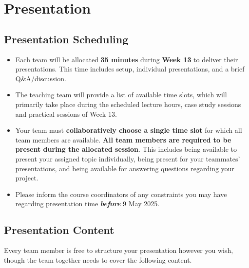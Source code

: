 \documentclass{csse4400}
\begin{document}
\section{Presentation}

\subsection{Presentation Scheduling}

\begin{itemize}
  \item Each team will be allocated \textbf{35 minutes} during \textbf{Week 13} to deliver their presentations. This time includes setup, individual presentations, and a brief Q\&A/discussion.
  \item The teaching team will provide a list of available time slots, which will primarily take place during the scheduled lecture hours, case study sessions and practical sessions of Week 13.
  \item Your team must \textbf{collaboratively choose a single time slot} for which all team members are available. \textbf{All team members are required to be present during the allocated session}. This includes being available to present your assigned topic individually, being present for your teammates' presentations, and being available for answering questions regarding your project.
  \item Please inform the course coordinators of any constraints you may have regarding presentation time \textbf{\textit{before}} 9 May 2025.
\end{itemize}






\subsection{Presentation Content}

Every team member is free to structure your presentation however you wish, though the team together needs to cover the following content.
\end{document}

